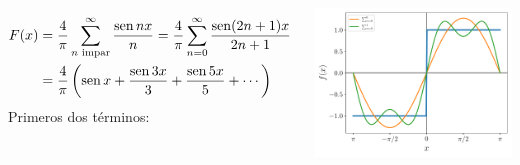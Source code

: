 \documentclass[9pt, aspectratio=169]{beamer}
\begin{document}
\begin{frame}
\begin{columns}[t]
\cx
\begin{align*}
F(x) &= \frac{4}{\pi} \sum_{n \text{ impar}}^{\infty} \frac{\operatorname{sen} nx}{n} =  \frac{4}{\pi} \sum_{n = 0}^{\infty} \frac{\operatorname{sen} (2 n + 1) x}{2 n + 1}\\
     &= \frac{4}{\pi} \left( \operatorname{sen} x + \frac{\operatorname{sen} 3x}{3} + \frac{\operatorname{sen} 5 x}{5} + \cdots \right)
\end{align*}
Primeros dos términos:
\begin{center}
    \includegraphics[scale=0.45]{figs/step-01.pdf}
\end{center} \pause


\end{columns}
\end{frame}
\end{document}
